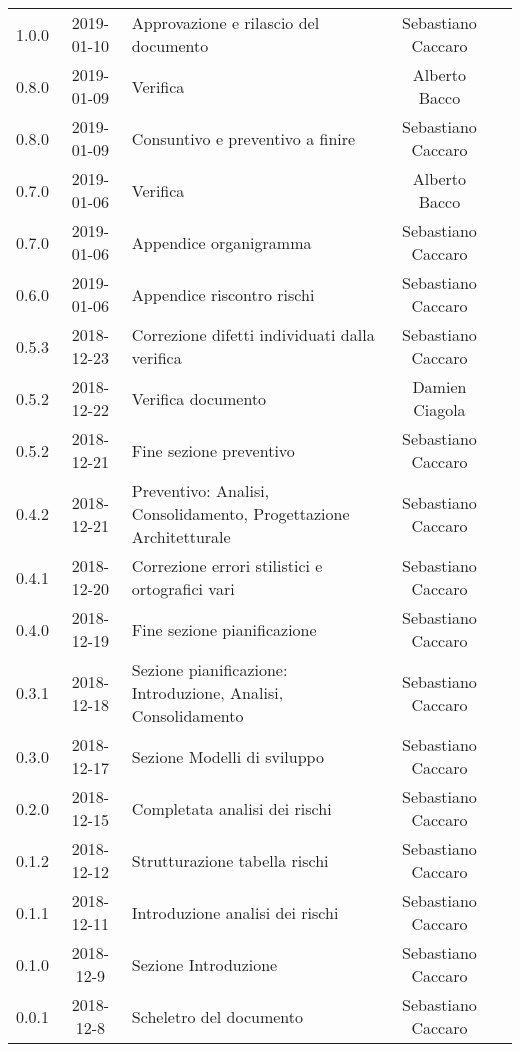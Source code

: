 {\begin{longtable}{ c c  C{4cm}  c  c }
		1.0.0 & 2019-01-10 & Approvazione e rilascio del documento & Sebastiano Caccaro & \Res{}\\

		0.8.0 & 2019-01-09 & Verifica & Alberto Bacco & \ver{}\\
		
		0.8.0 & 2019-01-09 & Consuntivo e preventivo a finire & Sebastiano Caccaro & \reda{}\\			
		
		0.7.0 & 2019-01-06 & Verifica & Alberto Bacco & \ver{}\\		
		
		0.7.0 & 2019-01-06 & Appendice organigramma & Sebastiano Caccaro & \reda{}\\		
		
		0.6.0 & 2019-01-06 & Appendice riscontro rischi & Sebastiano Caccaro & \reda{}\\
					
		0.5.3 & 2018-12-23 & Correzione difetti individuati dalla verifica & Sebastiano Caccaro & \reda{}\\		
		
		0.5.2 & 2018-12-22 & Verifica documento & Damien Ciagola & \ver{}\\
		
		0.5.2 & 2018-12-21 & Fine sezione preventivo & Sebastiano Caccaro & \reda{}\\
		
		0.4.2 & 2018-12-21 & Preventivo: Analisi, Consolidamento, Progettazione Architetturale & Sebastiano Caccaro & \reda{}\\
		
		0.4.1 & 2018-12-20 & Correzione errori stilistici e ortografici vari & Sebastiano Caccaro & \reda{}\\
		
		0.4.0 & 2018-12-19 & Fine sezione pianificazione & Sebastiano Caccaro & \reda{}\\
		
		0.3.1 & 2018-12-18 & Sezione pianificazione: Introduzione, Analisi, Consolidamento & Sebastiano Caccaro & \reda{}\\
		
		0.3.0 & 2018-12-17 & Sezione Modelli di sviluppo & Sebastiano Caccaro & \reda{}\\
				
		0.2.0 & 2018-12-15 & Completata analisi dei rischi & Sebastiano Caccaro & \reda{}\\
				
		0.1.2 & 2018-12-12 & Strutturazione tabella rischi & Sebastiano Caccaro & \reda{}\\
				
		0.1.1 & 2018-12-11 & Introduzione analisi dei rischi & Sebastiano Caccaro & \reda{}\\
				
		0.1.0 & 2018-12-9 & Sezione Introduzione & Sebastiano Caccaro & \reda{}\\
		
		0.0.1 & 2018-12-8 & Scheletro del documento & Sebastiano Caccaro & \reda{}\\
		
	\end{longtable}

}
